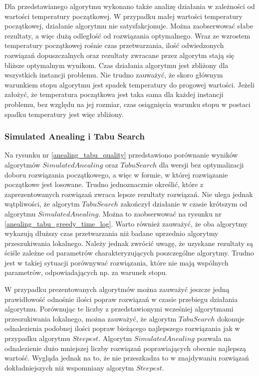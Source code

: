 Dla przedstawianego algorytmu wykonano także analizę działania
w zależności od wartości temperatury
początkowej. W przypadku małej wartości temperatury początkowej,
działanie algorytmu nie satysfakcjonuje. Można zaobserwować słabe
rezultaty, a więc dużą odległość od rozwiązania optymalnego. Wraz
ze wzrostem temperatury początkowej rośnie czas przetwarzania, ilość
odwiedzonych rozwiązań dopuszczalnych oraz rezultaty zwracane przez
algorytm stają się bliższe optymalnym wynikom.
Czas działania algorytmu jest zbliżony dla wszystkich instancji problemu.
Nie trudno zauważyć, że skoro głównym warunkiem stopu algorytmu jest
spadek temperatury do progowej wartości. Jeżeli założyć, że temperatura
początkowa jest taka sama dla każdej instancji problemu, bez względu
na jej rozmiar, czas osiągnięcia warunku stopu w postaci spadku
temperatury jest więc zbliżony.

\subsubsection {Simulated Anealing i Tabu Search}

Na rysunku nr \ref{anealing_tabu_quality} przedstawiono porównanie
wyników algorytmów $Simulated Anealing$ oraz $Tabu Search$ dla wersji
bez optymalizacji doboru rozwiązania początkowego, a więc w
formie, w której rozwiązanie początkowe jest losowane. Trudno
jednoznacznie określić, które z zaprezentowanych rozwiązań zwraca
lepsze rezultaty rozwiązań. Nie ulega jednak wątpliwości, że
algorytm $Tabu Search$ zakończył działanie w czasie krótszym od
algorytmu $Simulated Anealing$. Można to zaobserwować na rysunku nr
\ref{anealing_tabu_greedy_time_log}. Warto również zauważyć, że oba
algorytmy wykazują dłuższy czas przetwarzania niż badane uprzednio
algorytmy przeszukiwania lokalnego. Należy jednak zwrócić uwagę,
że uzyskane rezultaty są ściśle zależne od parametrów charakteryzujących
poszczególne algorytmy. Trudno jest w takiej sytuacji porównywać
rozwiązania, które nie mają wspólnych parametrów, odpowiadających np.
za warunek stopu.

W przypadku prezentowanych algorytmów można zauważyć jeszcze
jedną prawidłowość
odnośnie ilości popraw rozwiązań w czasie przebiegu działania
algorytmu. Porównując te liczby z przedstawionymi wcześniej
algorytmami przeszukiwania lokalnego, można zauważyć, że algorytm
$Tabu Search$ dokonuje odnalezienia podobnej ilości popraw
bieżącego najlepszego rozwiązania jak w przypadku algorytmu $Steepest$.
Algorytm $Simulated Anealing$ pozwala na odnalezienie dużo mniejszej
liczby rozwiązań poprawiających obecnie najlepszą wartość. Wygląda
jednak na to, że nie przeszkadza to w znajdywaniu rozwiązań
dokładniejszych niż wspomniany algorytm $Steepest$.

